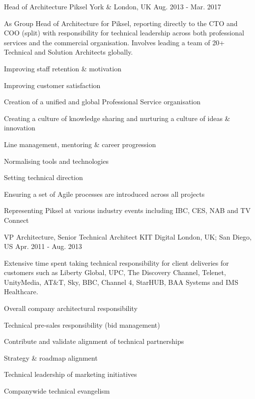 \begin{cventries}
\cvexpentry
{Head of Architecture} %
{Piksel} %
{York \& London, UK} %
{Aug. 2013 - Mar. 2017} %
{
\begin{cvitemstitle}
\item {As Group Head of Architecture for Piksel, reporting directly to the CTO and COO (split) with responsibility for technical leadership across both professional services and the commercial organisation. Involves leading a team of 20+ Technical and Solution Architects globally.}
\end{cvitemstitle}
}
{ %
\begin{cvitems}
\item {Improving staff retention \& motivation}
\item {Improving customer satisfaction}
\item {Creation of a unified and global Professional Service organisation}
\item {Creating a culture of knowledge sharing and nurturing a culture of ideas \& innovation}
\item {Line management, mentoring \& career progression}
\item {Normalising tools and technologies}
\item {Setting technical direction}
\item {Ensuring a set of Agile processes are introduced across all projects}
\item {Representing Piksel at various industry events including IBC, CES, NAB and TV Connect}
\end{cvitems}
}


\cvexpentry
{VP Architecture, Senior Technical Architect} %
{KIT Digital} %
{London, UK; San Diego, US} %
{Apr. 2011 - Aug. 2013} %
{
\begin{cvitemstitle}
\item {Extensive time spent taking technical responsibility for client deliveries for customers such as Liberty Global, UPC, The Discovery Channel, Telenet, UnityMedia, AT\&T, Sky, BBC, Channel 4, StarHUB, BAA Systems and IMS Healthcare.}
\end{cvitemstitle}
}
{ %
\begin{cvitems}
\item{Overall company architectural responsibility}
\item{Technical pre-sales responsibility (bid management)}
\item{Contribute and validate alignment of technical partnerships}
\item{Strategy \& roadmap alignment}
\item{Technical leadership of marketing initiatives}
\item{Companywide technical evangelism }
\end{cvitems}
}


\end{cventries}
